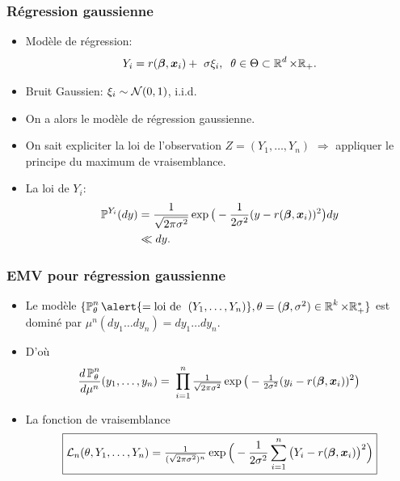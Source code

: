 \begin{frame}
\frametitle{Régression gaussienne}


\begin{itemize}
\item  \alert{Modèle de régression}:
$$Y_i =
r({\boldsymbol{\beta}},\operatorname{\boldsymbol{x}}_i)+\ \sigma \xi_i,\;\;\theta \in \Theta\subset  \operatorname{{\mathbb R}}^d \times \mathbb{R}_+.$$
\item  \alert{Bruit Gaussien:} $\xi_i \sim \mathcal{N}(0,1)$, i.i.d.
\item On a alors le modèle de \alert{régression gaussienne}.
\item \alert{On sait expliciter la loi de l'observation} $Z=(Y_1,\dots,Y_n)$ $\Longrightarrow$ appliquer le
principe du maximum de vraisemblance.
\item La loi de $Y_i$:
\begin{align*}
\operatorname{{\mathbb P}}^{Y_i}(dy) & = \frac{1}{\sqrt{2\pi \sigma^2}}\exp\big
(-\frac{1}{2\sigma^2}(y-r({\boldsymbol{\beta}},\operatorname{\boldsymbol{x}}_i))^2\big)dy \\
& \ll dy.
\end{align*}

\end{itemize}
\end{frame}

\begin{frame}
\frametitle{EMV pour régression gaussienne}
\begin{itemize}
\item  Le modèle $\{\PP_\truetheta^n \alert{ = \text{loi de }\;(Y_1,\ldots, Y_n)},\truetheta = (\truebeta,\sigma^2) \in \R^k \times \rset_+^* \}$ est \alert{dominé} par
$\mu^n(dy_1\ldots dy_n) = dy_1\ldots dy_n.$
\item D'où
\[
 \frac{d\operatorname{{\mathbb P}}_\theta^n}{d\mu^n}(y_1,\ldots, y_n)
  =\; \prod_{i=1}^n \tfrac{1}{\sqrt{2\pi \sigma^2}}\exp
  \big(-\tfrac{1}{2\sigma^2}(y_i-r({\boldsymbol{\beta}},\operatorname{\boldsymbol{x}}_i))^2\big)
\]
\item La fonction de vraisemblance
$$\boxed{{\mathcal L}_n(\theta, Y_1,\ldots, Y_n)
= \tfrac{1}{(\sqrt{2\pi \sigma^2})^{n}} \exp\Big(-\frac{1}{2\sigma^2}\sum_{i = 1}^n\big(Y_i-
r({\boldsymbol{\beta}},\operatorname{\boldsymbol{x}}_i)\big)^2\Big)}$$
\end{itemize}
\end{frame}

